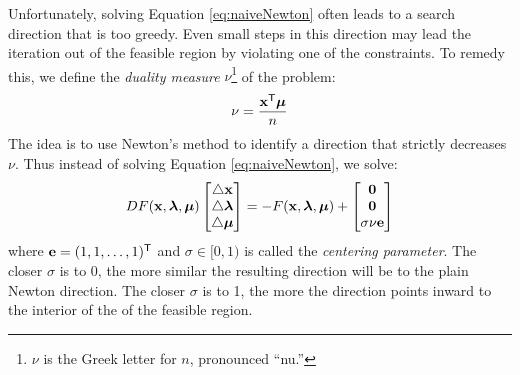  %

Unfortunately, solving Equation \ref{eq:naiveNewton} often leads to a search direction that is too greedy.
Even small steps in this direction may lead the iteration out of the feasible region by violating one of the constraints.
To remedy this, we define the \emph{duality measure} $\nu$\footnote{$\nu$ is the Greek letter for $n$, pronounced ``nu.''} of the problem: \[\nu = \frac{\mathbf{x}^{\mathsf T} \boldsymbol{\mu}}{n} \]
The idea is to use Newton's method to identify a direction that strictly decreases $\nu$.
Thus instead of solving Equation \ref{eq:naiveNewton}, we solve:
\begin{align}
DF(\mathbf{x},\boldsymbol{\lambda},\boldsymbol{\mu})
\begin{bmatrix}\triangle \mathbf{x}\\ \triangle \boldsymbol{\lambda}\\ \triangle \boldsymbol{\mu}\end{bmatrix}
= - F(\mathbf{x},\boldsymbol{\lambda},\boldsymbol{\mu}) +
\begin{bmatrix} \mathbf{0} \\ \mathbf{0} \\ \sigma\nu\mathbf{e} \end{bmatrix}
\label{eq:newNewton}
\end{align}
where $\mathbf{e} = (1,1,\ldots,1)^{\mathsf T} $ and $\sigma \in [0,1)$ is called the \emph{centering parameter}.
The closer $\sigma$ is to 0, the more similar the resulting direction will be to the plain Newton direction.
The closer $\sigma$ is to 1, the more the direction points inward to the interior of the of the feasible region.

